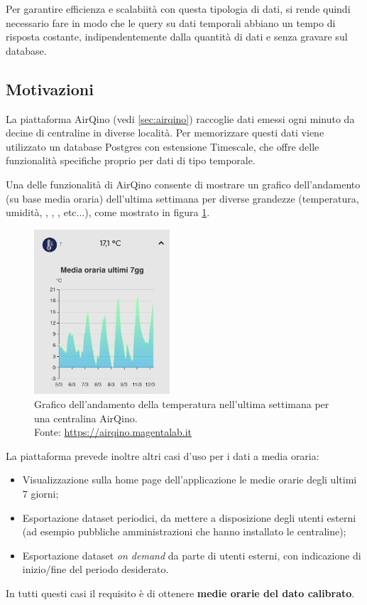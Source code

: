 Per garantire efficienza e scalabiità con questa tipologia di dati, si rende quindi necessario fare in modo che le query su dati temporali abbiano un tempo di risposta costante, indipendentemente dalla quantità di dati e senza gravare sul database.

\subsection{Motivazioni}\label{ssec:cont-aggr-motivazioni}
La piattaforma AirQino (vedi \ref{sec:airqino}) raccoglie dati emessi ogni minuto da decine di centraline in diverse località. Per memorizzare questi dati viene utilizzato un database Postgres con estensione Timescale, che offre delle funzionalità specifiche proprio per dati di tipo temporale.

Una delle funzionalità di AirQino consente di mostrare un grafico dell'andamento (su base media oraria) dell'ultima settimana per diverse grandezze (temperatura, umidità, , , ,  etc...), come mostrato in figura \ref{fig:airqino-temp}.

\begin{figure}[H]
\centering
\captionsetup{justification=centering}
\includegraphics[width=0.45\textwidth,height=\textheight,keepaspectratio]{img/airqino_temp}
\caption{Grafico dell'andamento della temperatura nell'ultima settimana per una centralina AirQino.\\Fonte: \url{https://airqino.magentalab.it}}
\label{fig:airqino-temp}
\end{figure}

La piattaforma prevede inoltre altri casi d’uso per i dati a media oraria:
\begin{itemize}
  \item Visualizzazione sulla home page dell’applicazione le medie orarie degli ultimi 7 giorni;
  \item Esportazione dataset periodici, da mettere a disposizione degli utenti esterni (ad esempio pubbliche amministrazioni che hanno installato le centraline);
  \item Esportazione dataset \textit{on demand} da parte di utenti esterni, con indicazione di inizio/fine del periodo desiderato.
\end{itemize}
In tutti questi casi il requisito è di ottenere \textbf{medie orarie del dato calibrato}.

